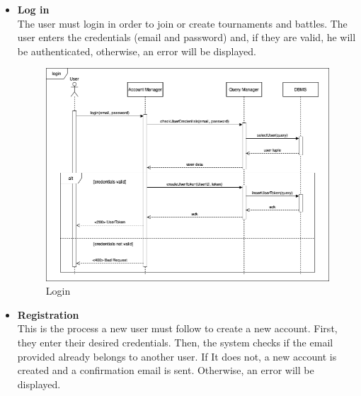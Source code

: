 \newpage
\begin{itemize}
    \item \textbf{Log in}\\
    The user must login in order to join or create tournaments and battles. The user enters the credentials (email and password) and, if they are valid, he will be authenticated, 
    otherwise, an error will be displayed.
    \begin{figure}[h]
        \centering
        \includegraphics[width=1\linewidth]{src/Login.png}
        \caption{Login}
        \label{fig:Login}
    \end{figure}
    \newpage
    \item \textbf{Registration}\\
    This is the process a new user must follow to create a new account. First, they enter their desired credentials. Then, the system checks if the email provided already belongs to 
    another user. If It does not, a new account is created and a confirmation email is sent. Otherwise, an error will be displayed.
    \begin{figure}[h]
        \centering

\end{figure}
\end{itemize}
